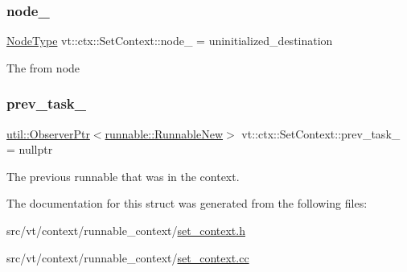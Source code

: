 \subsubsection{\texorpdfstring{node\+\_\+}{node\_}}
{\footnotesize\ttfamily \hyperlink{namespacevt_a866da9d0efc19c0a1ce79e9e492f47e2}{Node\+Type} vt\+::ctx\+::\+Set\+Context\+::node\+\_\+ = uninitialized\+\_\+destination\hspace{0.3cm}{\ttfamily [private]}}

The from node \mbox{\label{structvt_1_1ctx_1_1_set_context_af5a9e9f7f2f7deeadd17da554e8aa39b}} 
\subsubsection{\texorpdfstring{prev\+\_\+task\+\_\+}{prev\_task\_}}
{\footnotesize\ttfamily \hyperlink{namespacevt_1_1util_a7d480434049896696b9a50c38a766202}{util\+::\+Observer\+Ptr}$<$\hyperlink{structvt_1_1runnable_1_1_runnable_new}{runnable\+::\+Runnable\+New}$>$ vt\+::ctx\+::\+Set\+Context\+::prev\+\_\+task\+\_\+ = nullptr\hspace{0.3cm}{\ttfamily [private]}}



The previous runnable that was in the context. 



The documentation for this struct was generated from the following files\+:\begin{DoxyCompactItemize}
\item 
src/vt/context/runnable\+\_\+context/\hyperlink{set__context_8h}{set\+\_\+context.\+h}\item 
src/vt/context/runnable\+\_\+context/\hyperlink{set__context_8cc}{set\+\_\+context.\+cc}\end{DoxyCompactItemize}

